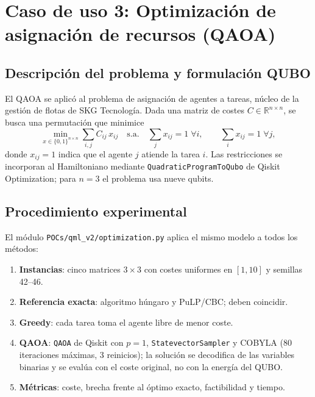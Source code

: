 \section{Caso de uso 3: Optimización de asignación de recursos (QAOA)}

\subsection{Descripción del problema y formulación QUBO}

El QAOA \citep{farhi2014} se aplicó al problema de asignación de agentes a tareas, núcleo de la gestión de flotas de SKG Tecnología. Dada una matriz de costes $C\in\mathbb{R}^{n\times n}$, se busca una permutación que minimice
\begin{equation}
  \min_{x\in\{0,1\}^{n\times n}} \sum_{i,j} C_{ij}\,x_{ij}
  \quad\text{s.a.}\quad \sum_j x_{ij}=1\;\forall i,\qquad \sum_i x_{ij}=1\;\forall j,
\end{equation}
donde $x_{ij}=1$ indica que el agente $j$ atiende la tarea $i$. Las restricciones se incorporan al Hamiltoniano mediante \texttt{QuadraticProgramToQubo} de Qiskit Optimization; para $n=3$ el problema usa nueve qubits.

\subsection{Procedimiento experimental}

El módulo \texttt{POCs/qml\_v2/optimization.py} aplica el mismo modelo a todos los métodos:
\begin{enumerate}
  \item \textbf{Instancias}: cinco matrices $3\times3$ con costes uniformes en $[1,10]$ y semillas 42--46.
  \item \textbf{Referencia exacta}: algoritmo húngaro y PuLP/CBC; deben coincidir.
  \item \textbf{Greedy}: cada tarea toma el agente libre de menor coste.
  \item \textbf{QAOA}: \texttt{QAOA} de Qiskit con $p=1$, \texttt{StatevectorSampler} y COBYLA (80 iteraciones máximas, 3 reinicios); la solución se decodifica de las variables binarias y se evalúa con el coste original, no con la energía del QUBO.
  \item \textbf{Métricas}: coste, brecha frente al óptimo exacto, factibilidad y tiempo.
\end{enumerate}

